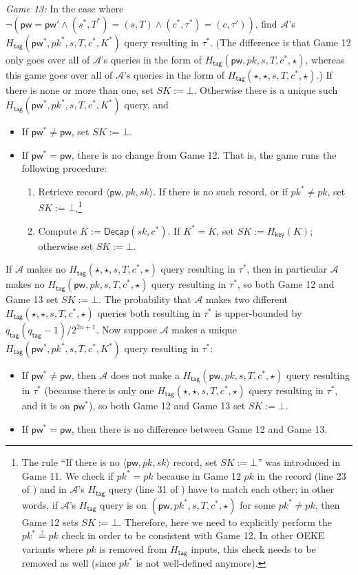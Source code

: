 \documentclass{article}
\theoremstyle{plain}
\theoremstyle{definition}
\theoremstyle{remark}
\newcommand{\adv}{\mathcal{A}}
\newcommand{\Decap}{\mathsf{Decap}}
\newcommand{\Hkey}{H_\mathsf{key}}
\newcommand{\Htag}{H_\mathsf{tag}}
\newcommand{\pw}{\mathsf{pw}}
\newcommand{\qtag}{q_\mathsf{tag}}
\begin{document}
\medskip\noindent\emph{Game 13:} In the case where $\neg(\pw = \pw' \land (s^*,T^*) = (s,T) \land (c^*,\tau^*) = (c,\tau'))$, find $\adv$'s $\Htag(\pw^*,pk^*,s,T,c^*,K^*)$ query resulting in $\tau^*$. (The difference is that Game 12 only goes over all of $\adv$'s queries in the form of $\Htag(\pw,pk,s,T,c^*,\star)$, whereas this game goes over all of $\adv$'s queries in the form of $\Htag(\star,\star,s,T,c^*,\star)$.) If there is none or more than one, set $SK := \bot$. Otherwise there is a unique such $\Htag(\pw^*,pk^*,s,T,c^*,K^*)$ query, and
\begin{itemize}
  \item If $\pw^* \neq \pw$, set $SK := \bot$.
  \item If $\pw^* = \pw$, there is no change from Game 12. That is, the game runs the following procedure:
      \begin{enumerate}
        \item Retrieve record $\langle\pw,pk,sk\rangle$. If there is no such record, or if $pk^* \neq pk$, set $SK := \bot$.\footnote{\label{fn:pk-consistency}The rule ``If there is no $\langle\pw,pk,sk\rangle$ record, set $SK := \bot$'' was introduced in Game 11. We check if $pk^* = pk$ because in Game 12 $pk$ in the record (line 23 of ) and in $\adv$'s $\Htag$ query (line 31 of ) have to match each other; in other words, if $\adv$'s $\Htag$ query is on $(\pw,pk^*,s,T,c^*,\star)$ for some $pk^* \neq pk$, then Game 12 sets $SK := \bot$. Therefore, here we need to explicitly perform the $pk^* \stackrel{?}{=} pk$ check in order to be consistent with Game 12. In other OEKE variants where $pk$ is removed from $\Htag$ inputs, this check needs to be removed as well (since $pk^*$ is not well-defined anymore).}
        \item Compute $K := \Decap(sk,c^*)$. If $K^* = K$, set $SK := \Hkey(K)$; otherwise set $SK := \bot$.
      \end{enumerate}
\end{itemize}

If $\adv$ makes no $\Htag(\star,\star,s,T,c^*,\star)$ query resulting in $\tau^*$, then in particular $\adv$ makes no $\Htag(\pw,pk,s,T,c^*,\star)$ query resulting in $\tau^*$, so both Game 12 and Game 13 set $SK := \bot$. The probability that $\adv$ makes two different $\Htag(\star,\star,s,T,c^*,\star)$ queries both resulting in $\tau^*$ is upper-bounded by $\qtag(\qtag-1)/2^{2n+1}$. Now suppose $\adv$ makes a unique $\Htag(\pw^*,pk^*,s,T,c^*,K^*)$ query resulting in $\tau^*$:
\begin{itemize}
  \item If $\pw^* \neq \pw$, then $\adv$ does not make a $\Htag(\pw,pk,s,T,c^*,\star)$ query resulting in $\tau^*$ (because there is only one $\Htag(\star,\star,s,T,c^*,\star)$ query resulting in $\tau^*$, and it is on $\pw^*$), so both Game 12 and Game 13 set $SK := \bot$.
  \item If $\pw^* = \pw$, then there is no difference between Game 12 and Game 13.
\end{itemize}
\end{document}
